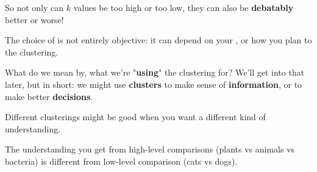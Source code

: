         So not only can $k$ values be too high or too low, they can also be \textbf{debatably} better or worse!
        
        \begin{concept}
            The  choice of  is not entirely objective: it can depend on your , or how you plan to  the clustering.
        \end{concept}
        
        What do we mean by, what we're "\textbf{using}" the clustering for? We'll get into that later, but in short: we might use \textbf{clusters} to make sense of \textbf{information}, or to make better \textbf{decisions}. 
        
        Different clusterings might be good when you want a different kind of understanding.
        
        \miniex The understanding you get from high-level comparisons (plants vs animals vs bacteria) is different from low-level comparison (cats vs dogs).
    